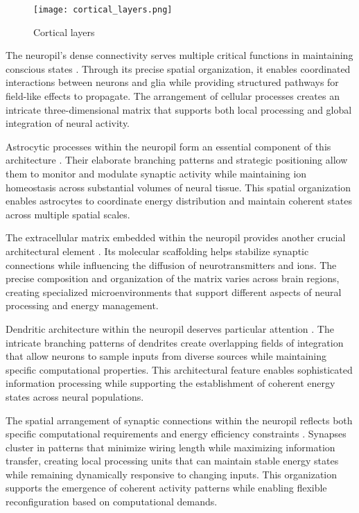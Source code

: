 \begin{refsection}
\begin{figure}[h]
    \centering
    \texttt{[image: cortical\_layers.png]}

    \caption{Cortical layers}
\end{figure}

The neuropil's dense connectivity serves multiple critical functions in maintaining conscious states \cite{Kasthuri2015}. Through its precise spatial organization, it enables coordinated interactions between neurons and glia while providing structured pathways for field-like effects to propagate. The arrangement of cellular processes creates an intricate three-dimensional matrix that supports both local processing and global integration of neural activity.

Astrocytic processes within the neuropil form an essential component of this architecture \cite{Peters1984}. Their elaborate branching patterns and strategic positioning allow them to monitor and modulate synaptic activity while maintaining ion homeostasis across substantial volumes of neural tissue. This spatial organization enables astrocytes to coordinate energy distribution and maintain coherent states across multiple spatial scales.

The extracellular matrix embedded within the neuropil provides another crucial architectural element \cite{Braitenberg1998}. Its molecular scaffolding helps stabilize synaptic connections while influencing the diffusion of neurotransmitters and ions. The precise composition and organization of the matrix varies across brain regions, creating specialized microenvironments that support different aspects of neural processing and energy management.

Dendritic architecture within the neuropil deserves particular attention \cite{Rockland2020}. The intricate branching patterns of dendrites create overlapping fields of integration that allow neurons to sample inputs from diverse sources while maintaining specific computational properties. This architectural feature enables sophisticated information processing while supporting the establishment of coherent energy states across neural populations.

The spatial arrangement of synaptic connections within the neuropil reflects both specific computational requirements and energy efficiency constraints \cite{Markram2015}. Synapses cluster in patterns that minimize wiring length while maximizing information transfer, creating local processing units that can maintain stable energy states while remaining dynamically responsive to changing inputs. This organization supports the emergence of coherent activity patterns while enabling flexible reconfiguration based on computational demands.


\end{refsection}
